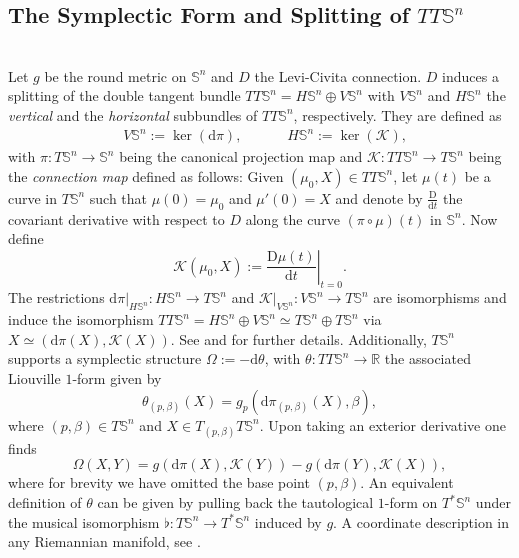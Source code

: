 \documentclass[12pt]{amsart}
\theoremstyle{plain}
\theoremstyle{definition}
\def\S{\mathbb{S}}
\newcommand{\td}{\mathrm{d}}
\numberwithin{equation}{section}
\begin{document}
\subsection{The Symplectic Form and Splitting of \texorpdfstring{$TT\S^n$}{TTSn}} \hfill \\
Let $g$ be the round metric on $\S^n$ and $D$ the Levi-Civita connection. $D$ induces a splitting of the double tangent bundle $TT\S^n=H\S^n\oplus V\S^n$ with $V\S^n$ and $H\S^n$ the \textit{vertical} and the \textit{horizontal} subbundles of $TT\S^n$, respectively. They are defined as
\begin{align*}
    &V\S^n:=\ker (\td\pi), && &&H\S^n:=\ker(\mathcal{K}),
\end{align*}
with $\pi:T\S^n\to \S^n$ being the canonical projection map and $\mathcal{K}:TT\S^n\to T\S^n$ being the \textit{connection map} defined as follows: Given $(\mu_0,X)\in TT\S^n$, let $\mu(t)$ be a curve in $T\S^n$ such that $\mu(0)=\mu_0$ and $\mu'(0)=X$ and denote by $\frac{\mathrm{D}}{\td t}$ the covariant derivative with respect to $D$ along the curve $(\pi\circ\mu)(t)$ in $\S^n$. Now define
\[
\mathcal{K}(\mu_0,X):=\left.\frac{\mathrm{D}\mu(t)}{\td t}\right|_{t=0}.
\]
The restrictions $\td \pi|_{H\S^n}:H\S^n\to T\S^n$ and $\mathcal{K}|_{V\S^n}:V\S^n\to T\S^n$ are isomorphisms and induce the isomorphism $TT\S^n =H\S^n\oplus V\S^n \simeq T\S^n\oplus T\S^n$ via  $X\simeq(\td\pi(X), \mathcal{K}(X))$. See \cite{Dom} and \cite{Kow} for further details. Additionally, $T\S^n$ supports a symplectic structure $\Omega:=-\td \theta$, with $\theta:TT\S^n\to\mathbb{R}$ the associated Liouville $1$-form given by
\begin{equation}\label{eq:louiville form in terms of round metric}
    \theta_{(p,\beta)}(X)=g_p(\td \pi_{(p,\beta)}(X),\beta),
  \end{equation}
where $(p,\beta)\in T\S^n$ and $X\in T_{(p,\beta)}T\S^n$. Upon taking an exterior derivative one finds
\begin{equation}\label{e:symplectic_structure}
\Omega(X,Y)=g(\td\pi(X),\mathcal{K}(Y))-g(\td\pi(Y),\mathcal{K}(X)),
\end{equation}
where for brevity we have omitted the base point $(p,\beta)$. An equivalent definition of $\theta$ can be given by pulling back the tautological $1$-form on $T^\ast \S^n$ under the musical isomorphism $\flat:T\S^n\to T^*\S^n$ induced by $g$. A coordinate description in any Riemannian manifold, see \cite{AGK11} \cite{AGK11a}.
\end{document}
